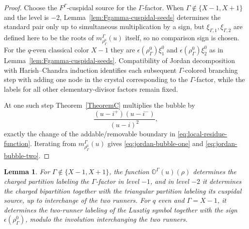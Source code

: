 \documentclass[12pt]{amsart}
\numberwithin{itemcounter}{subsection}
\theoremstyle{plain}
\newtheorem{lemma}[theorem]{Lemma}
\theoremstyle{definition}
\theoremstyle{remark}
\numberwithin{equation}{section}
\def\bbO{\mathbb{O}}
\begin{document}
\begin{proof}
Choose the $F^\Gamma$-cuspidal source for the $\Gamma$-factor.  When $\Gamma\notin\{X-1,X+1\}$ and the level is $-2$, Lemma~\ref{lem:Fgamma-cuspidal-seeds} determines the standard pair only up to simultaneous multiplication by a sign, but $\xi_{\Gamma,1},\xi_{\Gamma,2}$ are defined here to be the roots of $m_{\rho^0_\Gamma}^\Gamma(u)$ itself, so no comparison sign is chosen.  For the
$q$-even classical color $X-1$ they are
$\epsilon(\rho^0_\Gamma)\xi^0_1$ and
$\epsilon(\rho^0_\Gamma)\xi^0_2$ as in
Lemma~\ref{lem:Fgamma-cuspidal-seeds}.  Compatibility
of Jordan decomposition with Harish--Chandra induction identifies each
subsequent $\Gamma$-colored branching step with adding one node in the crystal corresponding to the $\Gamma$-factor, while the labels for all other elementary-divisor factors remain fixed.

At one such step Theorem~\ref{TheoremC} multiplies the bubble by
\[
 \frac{(u-i^+)(u-i^-)}{(u-i)^2},
\]
exactly the change of the addable/removable boundary in
\eqref{eq:local-residue-function}.  Iterating from $m_{\rho^0_\Gamma}^\Gamma(u)$
gives \eqref{eq:jordan-bubble-one} and \eqref{eq:jordan-bubble-two}.
\end{proof}

\begin{lemma}\label{lem:local-injectivity}
For $\Gamma\notin\{X-1,X+1\}$, the function $\bbO^\Gamma(u)(\rho)$ determines the charged partition labeling the $\Gamma$-factor in level $-1$, and in level $-2$ it determines the charged bipartition together with the triangular partition labeling its cuspidal source, up to interchange of the two runners.  For $q$ even and $\Gamma=X-1$, it determines the two-runner labeling of the Lusztig symbol together with the sign $\epsilon(\rho^0_\Gamma)$, modulo the involution interchanging the two runners.
\end{lemma}
\end{document}
